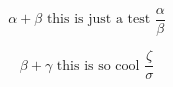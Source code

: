 \begin{equation}
  \alpha + \beta \text{ this is just a test } \frac{\alpha}{\beta}
\end{equation}

\begin{equation*}
  \beta + \gamma \text{ this is so cool } \frac{\zeta}{\sigma}
\end{equation*} 

